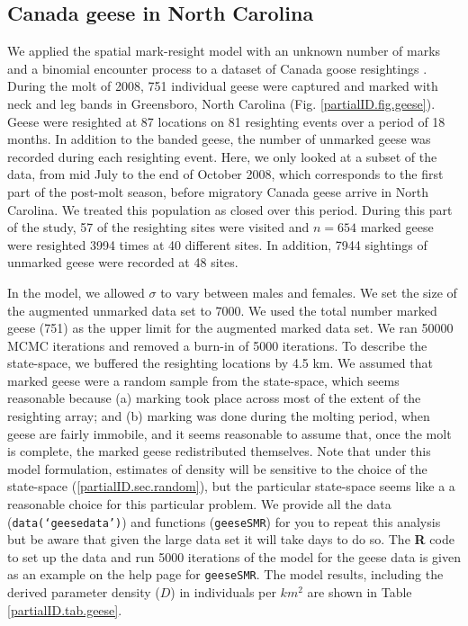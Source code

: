 \subsection{Canada geese in North Carolina}
\label{partialID.subsec.geese}
We applied the spatial mark-resight model with an unknown number of
marks and a binomial encounter process to a dataset of Canada goose
resightings \citep{rutledge:2012}. During the molt of 2008, 751 individual geese were captured
and marked with neck and leg bands in Greensboro, North Carolina
(Fig. \ref{partialID.fig.geese}). Geese were resighted at 87 locations
on 81 resighting events over a period of 18 months. In addition to the
banded geese, the number of unmarked geese was recorded during each
resighting event. Here, we only looked at a subset of the data, from
mid July to the end of October 2008, which corresponds to the first
part of the post-molt season, before migratory Canada geese arrive in
North Carolina. We treated this population as closed over this period.
During this part of the study, 57 of the resighting sites were visited
and $n = 654$ marked geese were resighted 3994 times at 40 different
sites. In addition, 7944 sightings of unmarked geese were recorded at
48 sites.

In the model, we allowed $\sigma$ to vary between males and
females. We set the size of the augmented unmarked data set to 7000. We used the total number marked geese (751) as the upper limit for the augmented marked data set. We ran 50000 MCMC iterations and removed a burn-in of 5000 iterations. To describe the state-space, we buffered the resighting locations by 4.5 km. We assumed that marked geese were a random sample from the state-space, which seems reasonable because (a) marking took place across most of the extent of the resighting array; and (b) marking was done during the molting period, when geese are fairly immobile, and it seems reasonable to assume that, once the molt is complete, the marked geese redistributed themselves.
Note that under this model formulation, estimates of density will be sensitive to the choice of the state-space (\ref{partialID.sec.random}), but the particular state-space seems like a a reasonable choice for this particular problem.
We provide all the data ({\tt data(`geesedata')}) and functions ({\tt geeseSMR}) for you to repeat this analysis but be aware that given the large data set it will take days to do so. The {\bf R} code to set up the data and run 5000 iterations of the model for the geese data is given as an example on the help page for {\tt geeseSMR}. The model results, including the derived parameter density ($D$) in individuals per $km^2$ are shown in Table \ref{partialID.tab.geese}.


